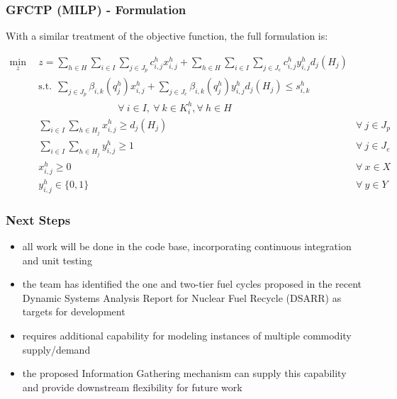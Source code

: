 \begin{frame}[ctb!]
  \frametitle{GFCTP (MILP) - Formulation} 
  
  With a similar treatment of the objective function, the full formulation is:

  \fontsize{7pt}{\baselineskip}\selectfont  
  \begin{subequations}\label{eqs:GFCTP-E}
    \begin{align}
      \label{eq:GRCTP-E_obj}
      \min_{z} \:\: 
      & 
      z = \sum_{h \in H}\sum_{i \in I}\sum_{j \in J_{p}}c_{i,j}^{h} x_{i,j}^{h} 
      + \sum_{h \in H}\sum_{i \in I}\sum_{j \in J_{e}}c_{i,j}^{h} y_{i,j}^{h} d_{j}(H_{j})
      && \\
      \label{eq:GRCTP-E_sup}
      &
      \text{s.t.} \:\: 
      \sum_{j \in J_{p}}\beta_{i,k}(q_{j}^{h}) x_{i,j}^{h}
      + \sum_{j \in J_{e}}\beta_{i,k}(q_{j}^{h}) y_{i,j}^{h} d_{j}(H_{j}) \leq s_{i,k}^{h} \nonumber \\
      &
      \qquad\qquad\qquad\qquad
      \forall \: i \in I, \: \forall \: k \in K_{i}^{h}, \forall \: {h \in H}\\
      \label{eq:GRCTP-E_dem_p}
      &
      \sum_{i \in I}\sum_{h \in H_{j}} x_{i,j}^{h} \geq d_{j}(H_{j})
      &
      \forall \: j \in J_{p} &\\
      \label{eq:GRCTP-E_dem_e}
      &
      \sum_{i \in I}\sum_{h \in H_{j}} y_{i,j}^{h} \geq 1
      &
      \forall \: j \in J_{e}  &\\
      \label{eq:GRCTP-E_x}
      &
      x_{i,j}^{h} \geq 0
      &
      \forall \: x \in X  &\\
      \label{eq:GRCTP-E_y}
      &
      y_{i,j}^{h} \in \{0,1\}
      &
      \forall \: y \in Y &
    \end{align}
  \end{subequations}

\end{frame}

\begin{frame}[ctb!]
  \frametitle{Next Steps} 
  
  \begin{itemize}
    \item all work will be done in the
      \href{github.com/cyclus/cyclus}{\Cyclus} code base, incorporating
      continuous integration and unit testing
    \item the \Cyclus team has identified the one and two-tier fuel cycles
      proposed in the recent Dynamic Systems Analysis Report for Nuclear Fuel
      Recycle (DSARR) \cite{dixon_dynamic_2008} as targets for
      development
    \item \Cyclus requires additional capability for modeling instances of
      multiple commodity supply/demand
    \item the proposed Information Gathering mechanism can supply this capability
      and provide downstream flexibility for future work
  \end{itemize}
\end{frame}

